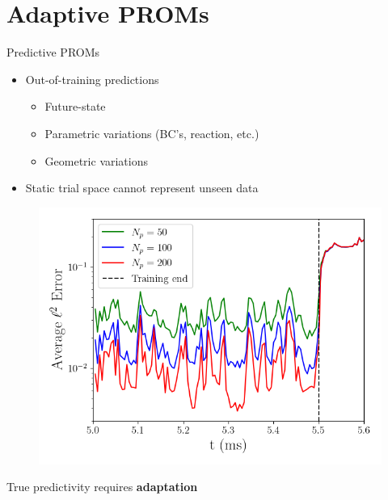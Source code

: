 \documentclass[]{beamer}
\begin{document}
\section*{Adaptive PROMs}

\begin{frame}{Predictive PROMs}
	\begin{itemize}
		\item Out-of-training predictions
		\begin{itemize}
			\item Future-state
			\item Parametric variations (BC's, reaction, etc.)
			\item Geometric variations
		\end{itemize}
		\item Static trial space cannot represent unseen data
	\end{itemize}
	\begin{figure}
		\begin{minipage}{0.49\linewidth}
			\includegraphics[width=0.9\linewidth]{Images/experiments/cvrc/proj_err_time.png}
		\end{minipage}	
		\begin{minipage}{0.49\linewidth}
			
		\end{minipage}
	\end{figure}
	\begin{tcolorbox}[colframe=blue!50!white,halign=center]
		True predictivity requires \textbf{adaptation}
	\end{tcolorbox}
\end{frame}
\end{document}
